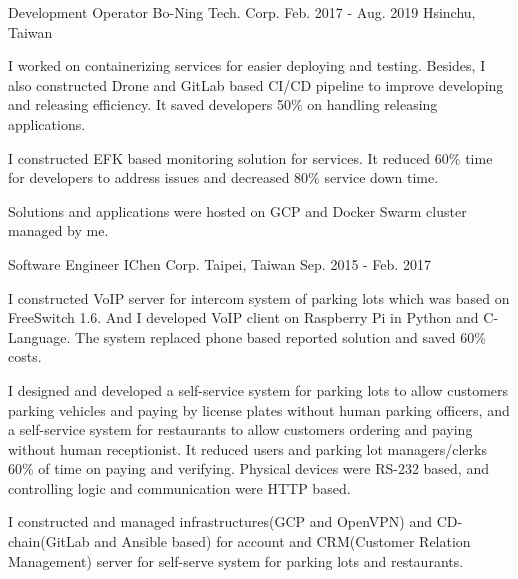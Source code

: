 \begin{cventries}
    \cventry
        {Development Operator}
        {Bo-Ning Tech. Corp.}
        {Feb. 2017 - Aug. 2019}
        {Hsinchu, Taiwan}
        {
            \begin{cvitems}
                \item
                    {
                        I worked on containerizing services for easier deploying and testing. Besides, I also constructed Drone and GitLab based  CI/CD pipeline to improve developing and releasing efficiency. It saved developers 50\% on handling releasing applications.
                    }
                \item
                    {
                        I constructed EFK based monitoring solution for services. It reduced 60\% time for developers to address issues and decreased 80\% service down time.
                    }
                \item
                    {
                        Solutions and applications were hosted on GCP and Docker Swarm cluster managed by me.
                    }
            \end{cvitems}
        }

    \cventry
        {Software Engineer}
        {IChen Corp.}
        {Taipei, Taiwan}
        {Sep. 2015 - Feb. 2017}
        {
            \begin{cvitems}
                \item
                    {
                        I constructed VoIP server for intercom system of parking lots which was based on FreeSwitch 1.6. And I developed VoIP client on Raspberry Pi in Python and C-Language. The system replaced phone based reported solution and saved 60\% costs.
                    }
                \item
                    {
                        I designed and developed a self-service system for parking lots to allow customers parking vehicles and paying by license plates without human parking officers, and a self-service system for restaurants to allow customers ordering and paying without human receptionist. It reduced users and parking lot managers/clerks 60\% of time on paying and verifying. Physical devices were RS-232 based, and controlling logic and communication were HTTP based. 
                    }
                \item
                    {
                        I constructed and managed infrastructures(GCP and OpenVPN) and CD-chain(GitLab and Ansible based) for account and CRM(Customer Relation Management) server for self-serve system for parking lots and restaurants.
                    }
            \end{cvitems}
        }

\end{cventries}
